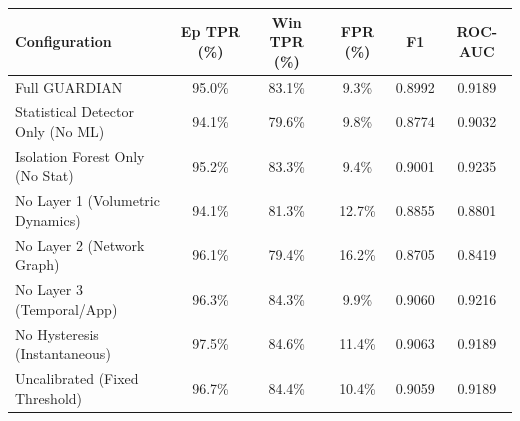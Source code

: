 \begin{tabular}{lccccc}
\toprule
\textbf{Configuration} & \textbf{Ep TPR (\%)} & \textbf{Win TPR (\%)} & \textbf{FPR (\%)} & \textbf{F1} & \textbf{ROC-AUC} \\
\midrule
Full GUARDIAN & 95.0\% & 83.1\% & 9.3\% & 0.8992 & 0.9189 \\
Statistical Detector Only (No ML) & 94.1\% & 79.6\% & 9.8\% & 0.8774 & 0.9032 \\
Isolation Forest Only (No Stat) & 95.2\% & 83.3\% & 9.4\% & 0.9001 & 0.9235 \\
No Layer 1 (Volumetric Dynamics) & 94.1\% & 81.3\% & 12.7\% & 0.8855 & 0.8801 \\
No Layer 2 (Network Graph) & 96.1\% & 79.4\% & 16.2\% & 0.8705 & 0.8419 \\
No Layer 3 (Temporal/App) & 96.3\% & 84.3\% & 9.9\% & 0.9060 & 0.9216 \\
No Hysteresis (Instantaneous) & 97.5\% & 84.6\% & 11.4\% & 0.9063 & 0.9189 \\
Uncalibrated (Fixed Threshold) & 96.7\% & 84.4\% & 10.4\% & 0.9059 & 0.9189 \\
\bottomrule
\end{tabular}